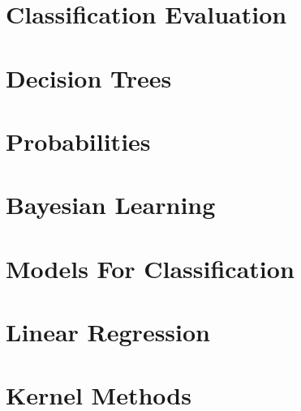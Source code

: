 \documentclass[a4paper, 11pt, extrafontsizes, oneside, openany, x11names]{memoir} %
\begin{document}

\frontmatter %
\clearpage %
\pagestyle{contents} %
\tableofcontents* %
\clearpage %

\mainmatter %
\chapter{Classification Evaluation}\label{chapter1} %

\newpage

\chapter{Decision Trees}


\chapter{Probabilities}


\chapter{Bayesian Learning}


\chapter{Models For Classification}


\chapter{Linear Regression}


\chapter{Kernel Methods}

\end{document}
